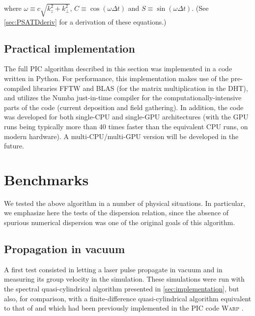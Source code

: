 \documentclass[1p,times]{elsarticle}
\begin{document}
\noindent where $\omega \equiv c\sqrt{k_z^2 + k_\perp^2}$, $C \equiv \cos(\omega \Delta t)$
and $S \equiv \sin(\omega \Delta t) $. (See \ref{sec:PSATDderiv} for a
derivation of these equations.)

\subsection{Practical implementation}

The full PIC algorithm described in this section was implemented in a
code written in Python. For performance, this implementation makes use of the
pre-compiled libraries FFTW \cite{FFTW} and BLAS \cite{BLAS} (for the matrix multiplication in the DHT), and utilizes the Numba just-in-time compiler \cite{Numba} for the
  computationally-intensive parts of the code (current deposition and
  field gathering). In addition, the code
  was developed for both single-CPU and single-GPU architectures (with the GPU runs
  being typically more than 40 times faster than the equivalent CPU runs, on
  modern hardware). A multi-CPU/multi-GPU version will be developed in
  the future.

\section{Benchmarks}
\label{sec:benchmarks}

We tested the above algorithm in a number of physical situations. In
particular, we emphasize here the tests of the dispersion relation, since the absence of
spurious numerical dispersion was one of the original goals of this algorithm.

\subsection{Propagation in vacuum}
\label{sec:vacuum_vg}

A first test consisted in letting a laser pulse propagate in vacuum and in
measuring its group velocity in the simulation. These simulations were
run with the spectral quasi-cylindrical algorithm presented in
\cref{sec:implementation}, but also, for comparison, with a finite-difference quasi-cylindrical
algorithm equivalent to that of \cite{Lifschitz,Davidson} and which had
been previously implemented in the PIC code \textsc{Warp} \citep{Warpref}.
\end{document}

